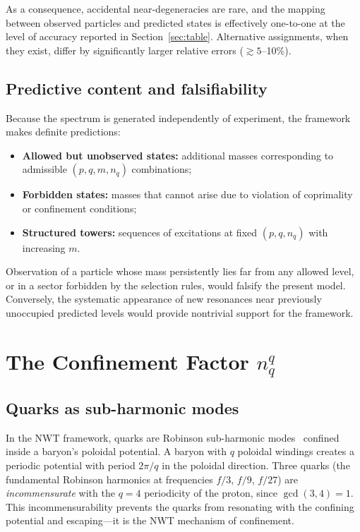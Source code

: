 \documentclass[11pt,a4paper]{article}
\begin{document}
As a consequence, accidental near-degeneracies are rare, and the
mapping between observed particles and predicted states is
effectively one-to-one at the level of accuracy reported in
Section~\ref{sec:table}.  Alternative assignments, when they exist,
differ by significantly larger relative errors ($\gtrsim 5$--10\%).

\subsection{Predictive content and falsifiability}

Because the spectrum is generated independently of experiment, the
framework makes definite predictions:

\begin{itemize}
  \item \textbf{Allowed but unobserved states:} additional masses
    corresponding to admissible $(p,q,m,n_q)$ combinations;
  \item \textbf{Forbidden states:} masses that cannot arise due to
    violation of coprimality or confinement conditions;
  \item \textbf{Structured towers:} sequences of excitations at fixed
    $(p,q,n_q)$ with increasing $m$.
\end{itemize}

Observation of a particle whose mass persistently lies far from any
allowed level, or in a sector forbidden by the selection rules,
would falsify the present model.  Conversely, the systematic
appearance of new resonances near previously unoccupied predicted
levels would provide nontrivial support for the framework.


\section{The Confinement Factor $n_q^q$}
\label{sec:confinement}

\subsection{Quarks as sub-harmonic modes}

In the NWT framework, quarks are Robinson sub-harmonic
modes~\cite{Robinson} confined inside a baryon's poloidal potential.
A baryon with $q$ poloidal windings creates a periodic potential
with period $2\pi/q$ in the poloidal direction.  Three quarks
(the fundamental Robinson harmonics at frequencies $f/3$, $f/9$,
$f/27$) are \emph{incommensurate} with the $q = 4$ periodicity of
the proton, since $\gcd(3, 4) = 1$.  This incommensurability
prevents the quarks from resonating with the confining potential
and escaping---it is the NWT mechanism of confinement.
\end{document}
